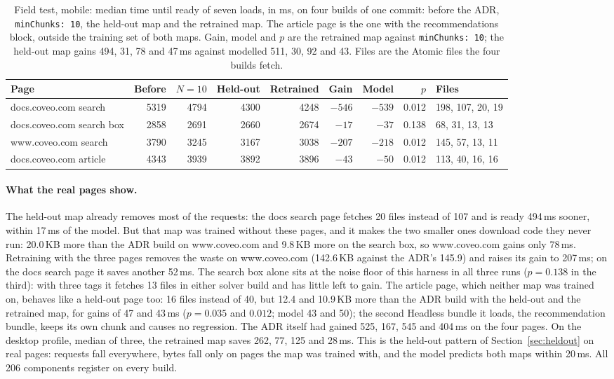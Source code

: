 \documentclass[11pt]{article}
\newcommand{\code}[1]{\texttt{#1}}
\begin{document}
\begin{table}[t]
\centering\small
\caption{Field test, mobile: median time until ready of seven loads, in ms, on four builds of one commit: before the ADR, \code{minChunks: 10}, the held-out map and the retrained map. The article page is the one with the recommendations block, outside the training set of both maps. Gain, model and $p$ are the retrained map against \code{minChunks: 10}; the held-out map gains 494, 31, 78 and 47\,ms against modelled 511, 30, 92 and 43. Files are the Atomic files the four builds fetch.}
\label{tab:field}
\footnotesize\setlength{\tabcolsep}{4pt}
\begin{tabular}{lrrrrrrrl}
\toprule
Page & Before & $N = 10$ & Held-out & Retrained & Gain & Model & $p$ & Files\\
\midrule
docs.coveo.com search & 5319 & 4794 & 4300 & 4248 & $-546$ & $-539$ & 0.012 & 198, 107, 20, 19\\
docs.coveo.com search box & 2858 & 2691 & 2660 & 2674 & $-17$ & $-37$ & 0.138 & 68, 31, 13, 13\\
www.coveo.com search & 3790 & 3245 & 3167 & 3038 & $-207$ & $-218$ & 0.012 & 145, 57, 13, 11\\
docs.coveo.com article & 4343 & 3939 & 3892 & 3896 & $-43$ & $-50$ & 0.012 & 113, 40, 16, 16\\
\bottomrule
\end{tabular}
\end{table}

\paragraph{What the real pages show.} The held-out map already removes most of the requests: the docs search page fetches 20 files instead of 107 and is ready 494\,ms sooner, within 17\,ms of the model. But that map was trained without these pages, and it makes the two smaller ones download code they never run: 20.0\,KB more than the ADR build on www.coveo.com and 9.8\,KB more on the search box, so www.coveo.com gains only 78\,ms. Retraining with the three pages removes the waste on www.coveo.com (142.6\,KB against the ADR's 145.9) and raises its gain to 207\,ms; on the docs search page it saves another 52\,ms. The search box alone sits at the noise floor of this harness in all three runs ($p = 0.138$ in the third): with three tags it fetches 13 files in either solver build and has little left to gain. The article page, which neither map was trained on, behaves like a held-out page too: 16 files instead of 40, but 12.4 and 10.9\,KB more than the ADR build with the held-out and the retrained map, for gains of 47 and 43\,ms ($p = 0.035$ and $0.012$; model 43 and 50); the second Headless bundle it loads, the recommendation bundle, keeps its own chunk and causes no regression. The ADR itself had gained 525, 167, 545 and 404\,ms on the four pages. On the desktop profile, median of three, the retrained map saves 262, 77, 125 and 28\,ms. This is the held-out pattern of Section~\ref{sec:heldout} on real pages: requests fall everywhere, bytes fall only on pages the map was trained with, and the model predicts both maps within 20\,ms. All 206 components register on every build.
\end{document}
